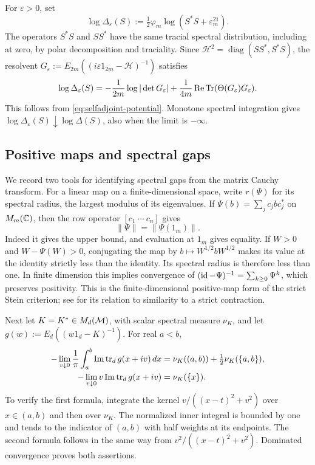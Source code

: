 For $\varepsilon>0$, set
\begin{equation}\label{eq:regularized-determinant}
 \log\Delta_\varepsilon(S)
       :=\tfrac12\varphi_m\log(S^*S+\varepsilon^21_m).
\end{equation}
The operators $S^*S$ and $SS^*$ have the same tracial spectral distribution, including at zero, by polar decomposition and traciality.
Since $\mathscr H^2=\operatorname{diag}(SS^*,S^*S)$, the resolvent $G_\varepsilon:=E_{2m}((i\varepsilon 1_{2m}-\mathscr H)^{-1})$ satisfies
\begin{equation}\label{eq:regularized-primitive}
 \log\Delta_\varepsilon(S)
 =-\frac1{2m}\log|\det G_\varepsilon|
  +\frac1{4m}\operatorname{Re}\operatorname{Tr}(\Theta(G_\varepsilon)G_\varepsilon).
\end{equation}
This follows from \eqref{eq:selfadjoint-potential}.
Monotone spectral integration gives $\log\Delta_\varepsilon(S)\downarrow\log\Delta(S)$, also when the limit is $-\infty$.

\subsection{Positive maps and spectral gaps}\label{subsec:gap-tools}
We record two tools for identifying spectral gaps from the matrix Cauchy transform.
For a linear map on a finite-dimensional space, write $r(\Psi)$ for its spectral radius, the largest modulus of its eigenvalues.
If $\Psi(b)=\sum_j c_jbc_j^*$ on $M_m(\mathbb C)$, then the row operator $[c_1\ \cdots\ c_n]$ gives
\[
 \|\Psi\|=\|\Psi(1_m)\|.
\]
Indeed it gives the upper bound, and evaluation at $1_m$ gives equality.
If $W>0$ and $W-\Psi(W)>0$, conjugating the map by $b\mapsto W^{1/2}bW^{1/2}$ makes its value at the identity strictly less than the identity.
Its spectral radius is therefore less than one.
In finite dimension this implies convergence of $(\operatorname{id}-\Psi)^{-1}=\sum_{k\ge0}\Psi^k$, which preserves positivity.
This is the finite-dimensional positive-map form of the strict Stein criterion; see \cite[Lemma 5.5 and Theorem 5.9]{Pop03} for its relation to similarity to a strict contraction.

Next let $K=K^*\in M_d(\mathcal M)$, with scalar spectral measure $\nu_K$, and let $g(w):=E_d((w1_d-K)^{-1})$.
For real $a<b$,
\begin{align}
 -\lim_{v\downarrow0}\frac1\pi
     \int_a^b\operatorname{Im}\operatorname{tr}_d g(x+iv)\,d x
   &=\nu_K((a,b))+\tfrac12\nu_K(\{a,b\}),
       \label{eq:stieltjes-interval}\\
 -\lim_{v\downarrow0}v\operatorname{Im}\operatorname{tr}_d g(x+iv)
   &=\nu_K(\{x\}).\label{eq:stieltjes-atom}
\end{align}
To verify the first formula, integrate the kernel $v/((x-t)^2+v^2)$ over $x\in(a,b)$ and then over $\nu_K$.
The normalized inner integral is bounded by one and tends to the indicator of $(a,b)$ with half weights at its endpoints.
The second formula follows in the same way from $v^2/((x-t)^2+v^2)$.
Dominated convergence proves both assertions.

